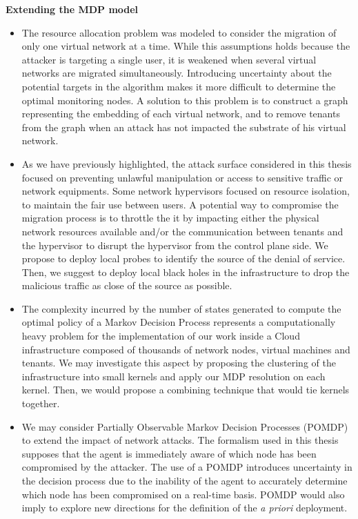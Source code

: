 \textbf{Extending the MDP model}
\begin{itemize}
    \item 
    The resource allocation problem was modeled to consider the migration of only one virtual network at a time. While this assumptions holds because the attacker is targeting a single user, it is weakened when several virtual networks are migrated simultaneously. Introducing uncertainty about the potential targets in the algorithm makes it more difficult to determine the optimal monitoring nodes. A solution to this problem is to construct a graph representing the embedding of each virtual network, and to remove tenants from the graph when an attack has not impacted the substrate of his virtual network.

    \item 
    As we have previously highlighted, the attack surface considered in this thesis focused on preventing unlawful manipulation or access to sensitive traffic or network equipments. Some network hypervisors focused on resource isolation, to maintain the fair use between users. A potential way to compromise the migration process is to throttle the it by impacting either the physical network resources available and/or the communication between tenants and the hypervisor to disrupt the hypervisor from the control plane side. We propose to deploy local probes to identify the source of the denial of service. Then, we suggest to deploy local black holes in the infrastructure to drop the malicious traffic as close of the source as possible.

    \item 
    The complexity incurred by the number of states generated to compute the optimal policy of a Markov Decision Process represents a computationally heavy problem for the implementation of our work inside a Cloud infrastructure composed of thousands of network nodes, virtual machines and tenants. We may investigate this aspect by proposing the clustering of the infrastructure into small kernels and apply our MDP resolution on each kernel. Then, we would propose a combining technique that would tie kernels together.

    \item 
    We may consider Partially Observable Markov Decision Processes (POMDP) to extend the impact of network attacks.
    The formalism used in this thesis supposes that the agent is immediately aware of which node has been compromised by the attacker. The use of a POMDP introduces uncertainty in the decision process due to the inability of the agent to accurately determine which node has been compromised on a real-time basis. POMDP would also imply to explore new directions for the definition of the \textit{a priori} deployment.
    

\end{itemize}
